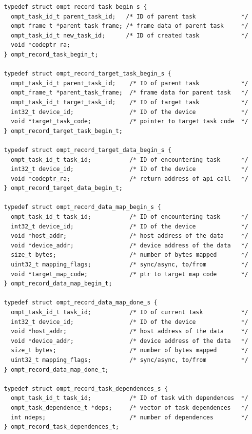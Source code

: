 \documentclass{article}
\begin{document}
\begin{verbatim}
typedef struct ompt_record_task_begin_s {
  ompt_task_id_t parent_task_id;   /* ID of parent task             */
  ompt_frame_t *parent_task_frame; /* frame data of parent task     */
  ompt_task_id_t new_task_id;      /* ID of created task            */
  void *codeptr_ra;               
} ompt_record_task_begin_t;

typedef struct ompt_record_target_task_begin_s {
  ompt_task_id_t parent_task_id;    /* ID of parent task            */
  ompt_frame_t *parent_task_frame;  /* frame data for parent task   */
  ompt_task_id_t target_task_id;    /* ID of target task            */
  int32_t device_id;                /* ID of the device             */
  void *target_task_code;           /* pointer to target task code  */
} ompt_record_target_task_begin_t;

typedef struct ompt_record_target_data_begin_s {
  ompt_task_id_t task_id;           /* ID of encountering task      */
  int32_t device_id;                /* ID of the device             */
  void *codeptr_ra;                 /* return address of api call   */
} ompt_record_target_data_begin_t;
 
typedef struct ompt_record_data_map_begin_s {
  ompt_task_id_t task_id;           /* ID of encountering task      */
  int32_t device_id;                /* ID of the device             */
  void *host_addr;                  /* host address of the data     */
  void *device_addr;                /* device address of the data   */ 
  size_t bytes;                     /* number of bytes mapped       */
  uint32_t mapping_flags;           /* sync/async, to/from          */
  void *target_map_code;            /* ptr to target map code       */
} ompt_record_data_map_begin_t;

typedef struct ompt_record_data_map_done_s {
  ompt_task_id_t task_id;           /* ID of current task           */
  int32_t device_id;                /* ID of the device             */
  void *host_addr;                  /* host address of the data     */
  void *device_addr;                /* device address of the data   */ 
  size_t bytes;                     /* number of bytes mapped       */
  uint32_t mapping_flags;           /* sync/async, to/from          */
} ompt_record_data_map_done_t;

typedef struct ompt_record_task_dependences_s {
  ompt_task_id_t task_id;           /* ID of task with dependences  */
  ompt_task_dependence_t *deps;     /* vector of task dependences   */
  int ndeps;                        /* number of dependences        */
} ompt_record_task_dependences_t;


\end{verbatim}
\end{document}

